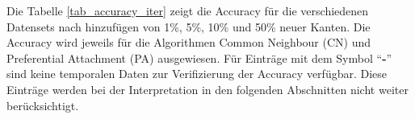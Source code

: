 Die Tabelle \ref{tab_accuracy_iter} zeigt die Accuracy für die verschiedenen Datensets nach hinzufügen von 1\%, 5\%, 10\% und 50\% neuer Kanten.
Die Accuracy wird jeweils für die Algorithmen Common Neighbour (CN) und Preferential Attachment (PA) ausgewiesen.
Für Einträge mit dem Symbol ``\textbf{-}'' sind keine temporalen Daten zur Verifizierung der Accuracy verfügbar.
Diese Einträge werden bei der Interpretation in den folgenden Abschnitten nicht weiter berücksichtigt.
\begin{table}[]
    \centering
    \label{tab_accuracy_iter}
    \caption{Erreichte Accuracy in \%}
\end{table}

